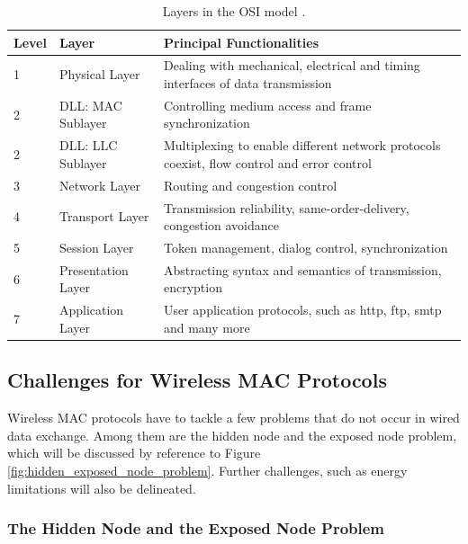 \begin{table}[b]
	\begin{center}
		\begin{tabular}{|p{1cm}|p{4cm}|p{8cm}|}
			\hline
				Level & Layer & Principal Functionalities \\
			\hline
				1 & Physical Layer & Dealing with mechanical, electrical and timing interfaces of data transmission  \\
				2 & DLL: MAC Sublayer & Controlling medium access and frame synchronization \\
				2 & DLL: LLC Sublayer & Multiplexing to enable different network protocols coexist, flow control and error control \\
				3 & Network Layer & Routing and congestion control \\
				4 &Transport Layer & Transmission reliability, same-order-delivery, congestion avoidance  \\
				5 & Session Layer & Token management, dialog control, synchronization \\
				6 & Presentation Layer & Abstracting syntax and semantics of transmission, encryption \\
				7 & Application Layer & User application protocols, such as http, ftp, smtp and many more \\
			\hline
		\end{tabular}\caption{Layers in the OSI model \cite{osi}.} \label{tab:osi-layers}
	\end{center}
\end{table}

\subsection{Challenges for Wireless MAC Protocols}

Wireless MAC protocols have to tackle a few problems that do not occur in wired data exchange. Among them are the hidden node and the exposed node problem, which will be discussed by reference to Figure \ref{fig:hidden_exposed_node_problem}. Further challenges, such as energy limitations will also be delineated.

\subsubsection{The Hidden Node and the Exposed Node Problem}

